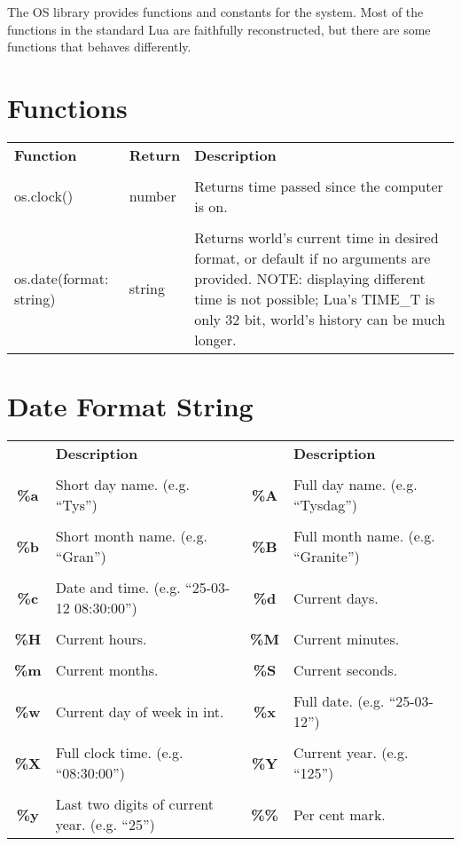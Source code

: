 The OS library provides functions and constants for the system. Most of the functions in the standard Lua are faithfully reconstructed, but there are some functions that behaves differently.

\section{Functions}

\begin{tabularx}{\textwidth}{l l X}
	\textbf{\large Function} & \textbf{\large Return} & \textbf{\large Description}
	\\ \\
	\endhead
	os.clock() & number & Returns time passed since the computer is on.
	\\ \\
	os.date(format: string) & string & Returns world's current time in desired format, or default if no arguments are provided. NOTE: displaying different time is not possible; Lua's TIME\_T is only 32 bit, world's history can be much longer.
\end{tabularx}

\section{Date Format String}

\begin{tabularx}{\textwidth}{c X c X}
	\textbf{\large } & \textbf{\large Description} & \textbf{\large } & \textbf{\large Description}
	\\ \\
	\endhead
	\textbf{\%a} & Short day name. (e.g. ``Tys'') & \textbf{\%A} & Full day name. (e.g. ``Tysdag'')
	\\ \\
	\textbf{\%b} & Short month name. (e.g. ``Gran'') & \textbf{\%B} & Full month name. (e.g. ``Granite'')
	\\ \\
	\textbf{\%c} & Date and time. (e.g. ``25-03-12 08:30:00'') & \textbf{\%d} & Current days.
	\\ \\
	\textbf{\%H} & Current hours. & \textbf{\%M} & Current minutes.
	\\ \\
	\textbf{\%m} & Current months. & \textbf{\%S} & Current seconds.
	\\ \\
	\textbf{\%w} & Current day of week in int. & \textbf{\%x} & Full date. (e.g. ``25-03-12'')
	\\ \\
	\textbf{\%X} & Full clock time. (e.g. ``08:30:00'') & \textbf{\%Y} & Current year. (e.g. ``125'')
	\\ \\
	\textbf{\%y} & Last two digits of current year. (e.g. ``25'') & \textbf{\%\%} & Per cent mark.
\end{tabularx}